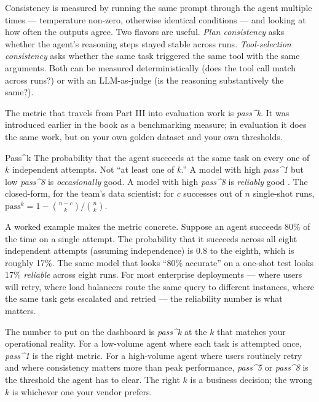 Consistency is measured by running the same prompt through the agent multiple times --- temperature non-zero, otherwise identical conditions --- and looking at how often the outputs agree. Two flavors are useful. \textit{Plan consistency} asks whether the agent's reasoning steps stayed stable across runs. \textit{Tool-selection consistency} asks whether the same task triggered the same tool with the same arguments. Both can be measured deterministically (does the tool call match across runs?) or with an LLM-as-judge (is the reasoning substantively the same?).

The metric that travels from Part III into evaluation work is \textit{pass\textasciicircum k}. It was introduced earlier in the book as a benchmarking measure; in evaluation it does the same work, but on your own golden dataset and your own thresholds.

\begin{TNdefinition}{Pass\textasciicircum k}
The probability that the agent succeeds at the same task on every one of $k$ independent attempts. Not ``at least one of $k$.'' A model with high \textit{pass\textasciicircum 1} but low \textit{pass\textasciicircum 8} is \textit{occasionally} good. A model with high \textit{pass\textasciicircum 8} is \textit{reliably} good \citep{yao2024taubench}. The closed-form, for the team's data scientist: for $c$ successes out of $n$ single-shot runs, $\textrm{pass}^k = 1 - \binom{n-c}{k} / \binom{n}{k}$.
\end{TNdefinition}

A worked example makes the metric concrete. Suppose an agent succeeds 80\% of the time on a single attempt. The probability that it succeeds across all eight independent attempts (assuming independence) is 0.8 to the eighth, which is roughly 17\%. The same model that looks ``80\% accurate'' on a one-shot test looks 17\% \textit{reliable} across eight runs. For most enterprise deployments --- where users will retry, where load balancers route the same query to different instances, where the same task gets escalated and retried --- the reliability number is what matters.

The number to put on the dashboard is \textit{pass\textasciicircum k} at the $k$ that matches your operational reality. For a low-volume agent where each task is attempted once, \textit{pass\textasciicircum 1} is the right metric. For a high-volume agent where users routinely retry and where consistency matters more than peak performance, \textit{pass\textasciicircum 5} or \textit{pass\textasciicircum 8} is the threshold the agent has to clear. The right $k$ is a business decision; the wrong $k$ is whichever one your vendor prefers.

